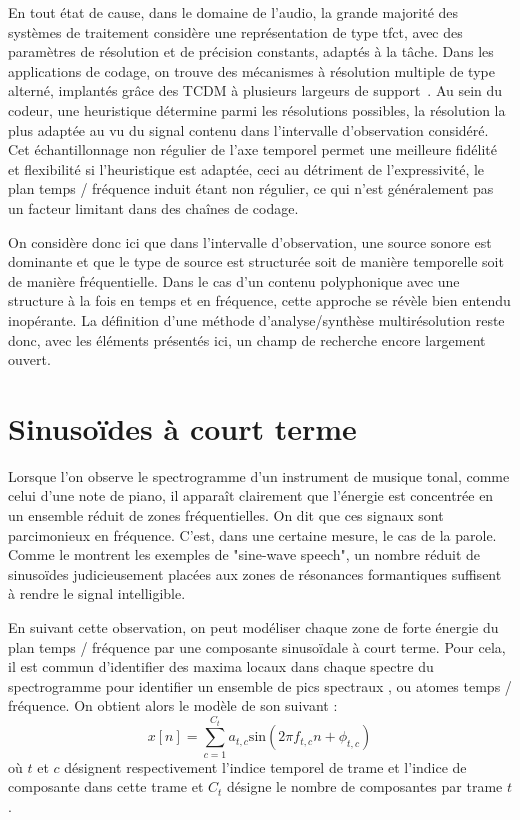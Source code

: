 En tout état de cause, dans le domaine de l'audio, la grande majorité des systèmes de traitement considère une représentation de type tfct, avec des paramètres de résolution et de précision constants, adaptés à la tâche. Dans les applications de codage, on trouve des mécanismes à résolution multiple de type alterné, implantés grâce des TCDM à plusieurs largeurs de support~\cite{brandenburg1999mp3}. Au sein du codeur, une heuristique détermine parmi les résolutions possibles, la résolution la plus adaptée au vu du signal contenu dans l'intervalle d'observation considéré. Cet échantillonnage non régulier de l'axe temporel permet une meilleure fidélité et flexibilité si l'heuristique est adaptée, ceci au détriment de l'expressivité, le plan temps / fréquence induit étant non régulier, ce qui n'est généralement pas un facteur limitant dans des chaînes de codage.

On considère donc ici que dans l'intervalle d'observation, une source sonore est dominante et que le type de source est structurée soit de manière temporelle soit de manière fréquentielle. Dans le cas d'un contenu polyphonique avec une structure à la fois en temps et en fréquence, cette approche se révèle bien entendu inopérante. La définition d'une méthode d'analyse/synthèse multirésolution reste donc, avec les éléments présentés ici, un champ de recherche encore largement ouvert.

\section{ \nmu Sinusoïdes à court terme}  \label{sec:sct}

Lorsque l'on observe le spectrogramme d'un instrument de musique tonal, comme celui d'une note de piano, il apparaît clairement que l'énergie est concentrée en un ensemble réduit de zones fréquentielles. On dit que ces signaux sont parcimonieux en fréquence. C'est, dans une certaine mesure, le cas de la parole. Comme le montrent les exemples de "sine-wave speech", un nombre réduit de sinusoïdes judicieusement placées aux zones de résonances formantiques suffisent à rendre le signal intelligible.

En suivant cette observation, on peut modéliser chaque zone de forte énergie du plan temps / fréquence par une composante sinusoïdale à court terme. Pour cela, il est commun d'identifier des maxima locaux dans chaque spectre du spectrogramme pour identifier un ensemble de \og pics spectraux \fg, ou \og atomes \fg temps / fréquence. On obtient alors le modèle de son suivant :
\begin{equation}
  x[n] = \sum_{c=1}^{C_t} a_{t, c} \mathrm{sin}(2 \pi f_{t, c} n + \phi_{t, c})
\end{equation}
où $t$ et $c$ désignent respectivement l'indice temporel de trame et l'indice de composante dans cette trame et $C_t$ désigne le nombre de composantes par trame $t$.

